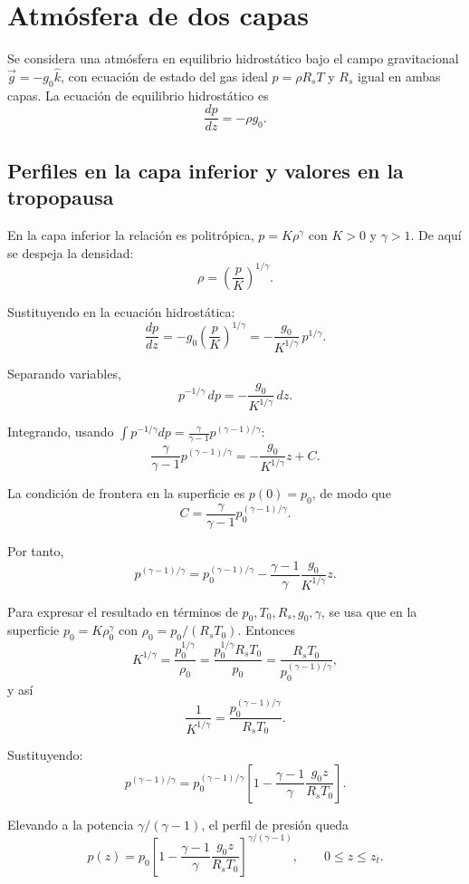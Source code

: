 \documentclass[11pt,a4paper]{article}
\begin{document}
\section{Atmósfera de dos capas}

Se considera una atmósfera en equilibrio hidrostático bajo el campo gravitacional
$\vec{g}=-g_{0}\hat{k}$, con ecuación de estado del gas ideal $p=\rho R_{s}T$
y $R_{s}$ igual en ambas capas. La ecuación de equilibrio hidrostático es
\[
\frac{dp}{dz}=-\rho g_{0}.
\]

\subsection{Perfiles en la capa inferior y valores en la tropopausa}

En la capa inferior la relación es politrópica, $p=K\rho^{\gamma}$ con $K>0$ y $\gamma>1$.
De aquí se despeja la densidad:
\[
\rho=\left(\frac{p}{K}\right)^{1/\gamma}.
\]

Sustituyendo en la ecuación hidrostática:
\[
\frac{dp}{dz}=-g_{0}\left(\frac{p}{K}\right)^{1/\gamma}
=-\frac{g_{0}}{K^{1/\gamma}}\,p^{1/\gamma}.
\]

Separando variables,
\[
p^{-1/\gamma}\,dp=-\frac{g_{0}}{K^{1/\gamma}}\,dz.
\]

Integrando, usando $\displaystyle \int p^{-1/\gamma}dp=\frac{\gamma}{\gamma-1}p^{(\gamma-1)/\gamma}$:
\[
\frac{\gamma}{\gamma-1}p^{(\gamma-1)/\gamma}
=-\frac{g_{0}}{K^{1/\gamma}}z+C.
\]

La condición de frontera en la superficie es $p(0)=p_{0}$, de modo que
\[
C=\frac{\gamma}{\gamma-1}p_{0}^{(\gamma-1)/\gamma}.
\]

Por tanto,
\[
p^{(\gamma-1)/\gamma}
=p_{0}^{(\gamma-1)/\gamma}-\frac{\gamma-1}{\gamma}\frac{g_{0}}{K^{1/\gamma}}z.
\]

Para expresar el resultado en términos de $p_{0},T_{0},R_{s},g_{0},\gamma$, se usa que en la superficie
$p_{0}=K\rho_{0}^{\gamma}$ con $\rho_{0}=p_{0}/(R_{s}T_{0})$. Entonces
\[
K^{1/\gamma}=\frac{p_{0}^{1/\gamma}}{\rho_{0}}
=\frac{p_{0}^{1/\gamma}R_{s}T_{0}}{p_{0}}
=\frac{R_{s}T_{0}}{p_{0}^{(\gamma-1)/\gamma}},
\]
y así
\[
\frac{1}{K^{1/\gamma}}=\frac{p_{0}^{(\gamma-1)/\gamma}}{R_{s}T_{0}}.
\]

Sustituyendo:
\[
p^{(\gamma-1)/\gamma}
=p_{0}^{(\gamma-1)/\gamma}\left[1-\frac{\gamma-1}{\gamma}\frac{g_{0}z}{R_{s}T_{0}}\right].
\]

Elevando a la potencia $\gamma/(\gamma-1)$, el perfil de presión queda
\[
\boxed{\,p(z)=p_{0}\left[1-\frac{\gamma-1}{\gamma}\frac{g_{0}z}{R_{s}T_{0}}\right]^{\gamma/(\gamma-1)},\qquad 0\le z\le z_{t}.\,}
\]
\end{document}
